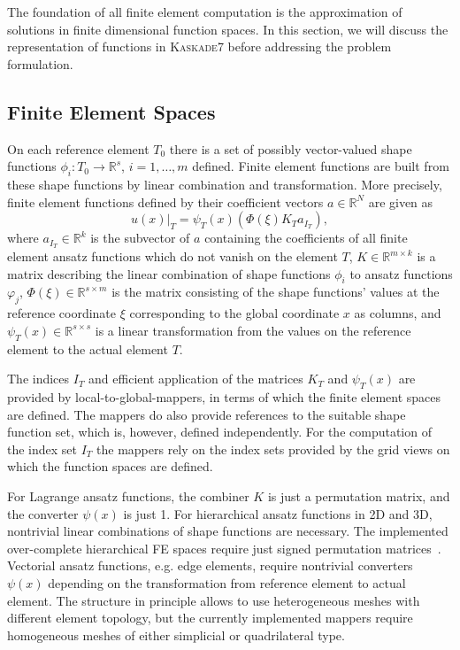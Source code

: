 \documentclass[11pt]{article}
\newcommand{\R}{\mathbb{R}}
\newcommand{\K}{\textsc{Kaskade7 }}
\begin{document}
The foundation of all finite element computation is the approximation of solutions in finite dimensional function spaces. In this section, we will discuss the representation of functions in \K before addressing the problem formulation.

\subsection{Finite Element Spaces} \label{FEspaces}
On each reference element $T_0$ there is a set of possibly vector-valued shape functions $\phi_i:T_0\to \R^s$, $i=1,\dots,m$ defined. Finite element functions are built from these shape functions by linear combination and transformation. More precisely, finite element functions defined by their coefficient vectors $a\in\R^N$ are given as
\[
  u(x)|_T = \psi_T(x)(\Phi(\xi)K_Ta_{I_T}) ,
\]
where $a_{I_T}\in \R^k$ is the subvector of $a$ containing the coefficients of all finite element ansatz functions which do not vanish on the element $T$, $K\in\R^{m\times k}$ is a matrix describing the linear combination of shape functions $\phi_i$ to ansatz functions $\varphi_j$, $\Phi(\xi)\in\R^{s\times m}$ is the matrix consisting of the shape functions' values at the reference coordinate $\xi$ corresponding to the global coordinate $x$ as columns, and $\psi_T(x)\in\R^{s\times s}$ is a linear transformation from the values on the reference element to the actual element $T$.

The indices $I_T$ and efficient application of the matrices $K_T$ and $\psi_T(x)$ are provided by local-to-global-mappers, in terms of which the finite element spaces are defined. The mappers do also provide references to the suitable shape function set, which is, however, defined independently. For the computation of the index set $I_T$ the mappers rely on the \dune index sets provided by the grid views on which the function spaces are defined.

For Lagrange ansatz functions, the combiner  $K$ is just a permutation matrix, and the converter $\psi(x)$ is just 1. For hierarchical ansatz functions in 2D and 3D, nontrivial linear combinations of shape functions are necessary. The implemented over-complete hierarchical FE spaces require just signed permutation matrices~\cite{Zumbusch1995}. Vectorial ansatz functions, e.g. edge elements, require nontrivial converters $\psi(x)$ depending on the transformation from reference element to actual element. The structure in principle allows to use heterogeneous meshes with different element topology, but the currently implemented mappers require homogeneous meshes of either simplicial or quadrilateral type.
\end{document}
